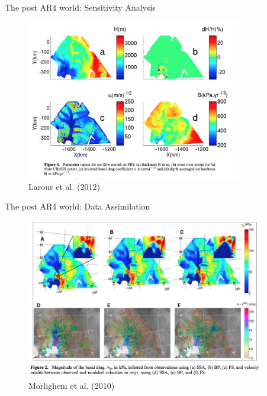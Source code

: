 \documentclass[hide notes,intlimits]{beamer}
\begin{document}
\begin{frame}{The post AR4 world: Sensitivity Analysis}
    \begin{figure}
      \includegraphics[height=7cm]{larour_2012_fig_4}
      \\ \tiny{Larour et al. (2012)}
    \end{figure}
\end{frame}

\begin{frame}{The post AR4 world: Data Assimilation}
    \begin{figure}
      \includegraphics[height=7cm]{morlighem_2010_fig_2}
      \\ \tiny{Morlighem et al. (2010)}
    \end{figure}
\end{frame}


\end{document}
